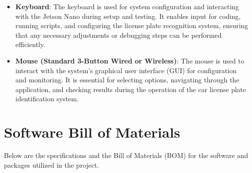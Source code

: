 \begin{itemize}[left=0pt]
	\item \textbf{Keyboard}: The keyboard is used for system configuration and interacting with the Jetson Nano during setup and testing. It enables input for coding, running scripts, and configuring the license plate recognition system, ensuring that any necessary adjustments or debugging steps can be performed efficiently. \cite{RCT:2025}
	
	\item \textbf{Mouse (Standard 3-Button Wired or Wireless)}: The mouse is used to interact with the system’s graphical user interface (GUI) for configuration and monitoring. It is essential for selecting options, navigating through the application, and checking results during the operation of the car license plate identification system. \cite{RMS:2025}
\end{itemize}


\section{Software Bill of Materials}
Below are the specifications and the Bill of Materials (BOM) for the software and packages utilized in the project.


